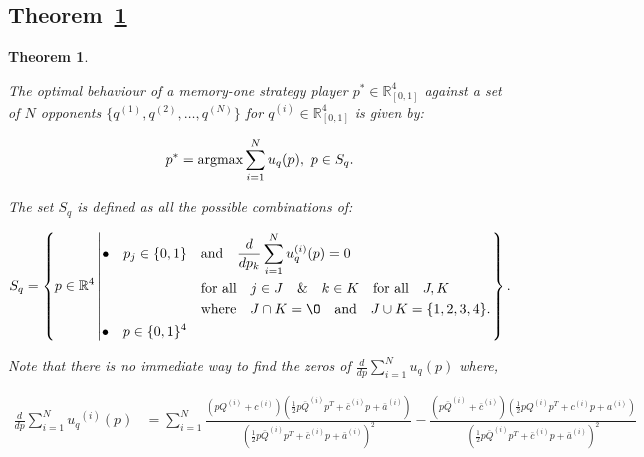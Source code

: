 \documentclass[10pt]{article}
\newcommand{\R}{\mathbb{R}}
\newtheorem{theorem}{Theorem}
\begin{document}
\subsection{Theorem~\ref{memone_group_best_response}}\label{appendix:memone_group_best_response}
\begin{theorem}\label{memone_group_best_response}

The optimal behaviour of a memory-one strategy player \(p^* \in \R_{[0, 1]} ^
4\) against a set of \(N\) opponents \(\{q^{(1)}, q^{(2)}, \dots, q^{(N)} \}\)
for \(q^{(i)} \in \R_{[0, 1]} ^ 4\) is given by:

\[p^* = \textnormal{argmax}\sum\limits_{i=1} ^ N  u_q(p), \ p \in S_q.\]

The set \(S_q\) is defined as all the possible combinations of:

{\scriptsize
\begin{equation}\label{eq:s_q_set}
    S_q =
    \left\{p \in \mathbb{R} ^ 4 \left|
        \begin{aligned}
            \bullet\quad p_j \in \{0, 1\} & \quad \text{and} \quad \frac{d}{dp_k} 
            \sum\limits_{i=1} ^ N  u_q^{(i)}(p) = 0 \\
            & \quad \text{for all} \quad j \in J \quad \&  \quad k \in K  \quad \text{for all} \quad J, K \\
            & \quad \text{where} \quad J \cap K = \O \quad
            \text{and} \quad J \cup K = \{1, 2, 3, 4\}.\\
            \bullet\quad  p \in \{0, 1\} ^ 4
        \end{aligned}\right.
    \right\}.
\end{equation}
}

Note that there is no immediate way to find the zeros of \(\frac{d}{dp}
\sum\limits_{i=1} ^ N  u_q(p)\) where,

{\scriptsize
\begin{align}\label{eq:mo_tournament_derivative}
    \frac{d}{dp} \sum\limits_{i=1} ^ {N} {u_q}^{(i)} (p) & = \displaystyle\sum\limits_{i=1} ^ {N}
    \frac{\left(pQ^{(i)} + c^{(i)}\right) \left(\frac{1}{2} p\bar{Q}^{(i)} p^T + \bar{c}^{(i)} p + \bar{a}^ {(i)}\right)}
    {\left(\frac{1}{2} p\bar{Q}^{(i)} p^T + \bar{c}^{(i)} p + \bar{a}^ {(i)}\right)^ 2}
    - \frac{\left(p\bar{Q}^{(i)} + \bar{c}^{(i)}\right) \left(\frac{1}{2} pQ^{(i)} p^T + c^{(i)} p + a^ {(i)}\right)}
    {\left(\frac{1}{2} p\bar{Q}^{(i)} p^T + \bar{c}^{(i)} p + \bar{a}^ {(i)}\right)^ 2}
\end{align}
}


\end{theorem}
\end{document}
